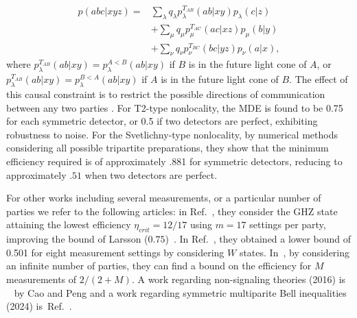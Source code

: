 \documentclass[aps,pra,reprint, superscriptaddress,showkeys]{revtex4-2}
\theoremstyle{plain}
\begin{document}
\begin{align}
p(abc|xyz) = & \sum_{\lambda} q_{\lambda} p_{\lambda}^{T_{AB}}(ab|xy)p_{\lambda}(c|z) \\
             & + \sum_{\mu} q_{\mu} p_{\mu}^{T_{AC}}(ac|xz)p_{\mu}(b|y) \\
             & + \sum_{\nu} q_{\nu} p_{\nu}^{T_{BC}}(bc|yz)p_{\nu}(a|x),
\end{align}
where $p_{\lambda}^{T_{AB}}(ab|xy)  = p_\lambda^{A<B}(ab|xy)$ if  $B$ is in the future light cone of $A$, or 
$p_{\lambda}^{T_{AB}}(ab|xy)  = p_\lambda^{B<A}(ab|xy)$ if $A$ is in the future light cone of $B$. The effect of this causal constraint is to restrict the possible directions of communication between any two parties \cite{Def_ofNL_2013Bancal, Gallego_NL_2012}.
For T2-type nonlocality, the MDE is found to be 0.75 for each symmetric detector, or 0.5 if two detectors are perfect, exhibiting robustness to noise. For the Svetlichny-type nonlocality, by numerical methods considering all possible tripartite preparations, they show that the minimum efficiency required is of approximately .881 for symmetric detectors, reducing to approximately $.51$ when two detectors are perfect. 


For other works including several measurements, or a particular number of parties we refer to the following articles:  in Ref.~\cite{Pal_Vertesi_GHZ},   they consider the GHZ state attaining the lowest efficiency $\eta_{crit} = 12/17$  using $m = 17$ settings per party, improving the bound of Larsson ($0.75$)~\cite{Larsson_GHZ_1, Larsson_GHZ_2}. In Ref.~\cite{Pal_Vertesi_W},  they obtained a lower bound of 0.501 for eight measurement settings by considering $W$ states. In~\cite{M_measurements_1, M_measurements_2, M_measurements_3}, by considering an infinite number of parties, they can find a bound on the efficiency for $M$ measurements of $2/(2+M)$. A work regarding non-signaling theories (2016)  is ~\cite{Cao2016} by Cao and Peng and a work regarding symmetric multiparite Bell inequalities (2024) is~Ref.~\cite{Simmetric_Multipartite_designolle}.
\end{document}
